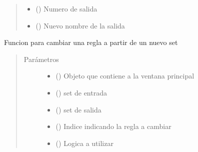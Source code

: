 \documentclass[letterpaper,10pt,spanish]{sphinxmanual}
\begin{document}
\begin{fulllineitems}
\begin{fulllineitems}
\begin{quote}
\begin{description}
\begin{itemize}
\item {} 
 () \textendash{} Numero de salida

\item {} 
 () \textendash{} Nuevo nombre de la salida

\end{itemize}

\end{description}\end{quote}

\end{fulllineitems}


\begin{fulllineitems}
\label{\detokenize{codigos/rutinas_fuzzy:rutinas_fuzzy.FuzzyController.cambiar_regla}}
Funcion para cambiar una regla a partir de un nuevo set
\begin{quote}\begin{description}
\item[{Parámetros}] \leavevmode\begin{itemize}
\item {} 
 () \textendash{} Objeto que contiene a la ventana principal

\item {} 
 () \textendash{} set de entrada

\item {} 
 () \textendash{} set de salida

\item {} 
 () \textendash{} Indice indicando la regla a cambiar

\item {} 
 () \textendash{} Logica a utilizar


\end{itemize}
\end{description}
\end{quote}
\end{fulllineitems}
\end{fulllineitems}
\end{document}
